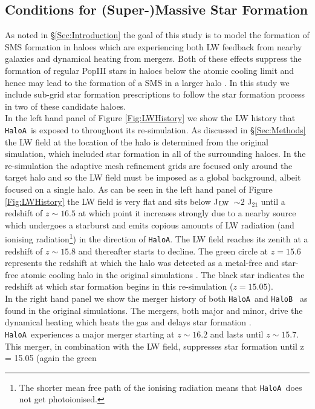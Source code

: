 \documentclass[graphics, twocolumn, usenatbib]{mn2e}
\newcommand{\JLW} {J$_{\rm LW}$}
\newcommand{\ha} {\texttt{HaloA~}}
\newcommand{\hb} {\texttt{HaloB~}}
\newcommand{\hac} {\texttt{HaloA}}
\begin{document}
\subsection{Conditions for (Super-)Massive Star Formation}
As noted in \S \ref{Sec:Introduction} the goal of this study is to model the formation of
SMS formation in haloes which are experiencing both LW feedback from nearby galaxies and
dynamical heating from mergers. Both of these effects suppress the formation of regular
PopIII stars in haloes
below the atomic cooling limit and hence may lead to the formation of a SMS in a larger
halo  \citep[as was found in][]{Wise_2019}. In this study we include 
sub-grid star formation prescriptions to follow the star formation process in 
two of these candidate haloes.\\
\indent In the left hand panel of Figure \ref{Fig:LWHistory} we show the LW history that \ha is
exposed to throughout its re-simulation. As discussed in \S \ref{Sec:Methods} the LW field at the
location of the halo is determined from the original simulation, which included star formation
in all of the surrounding haloes. In the re-simulation the adaptive mesh refinement
grids are focused only around the
target halo and so the LW field must be imposed as a global background, albeit focused on a single
halo. As can be seen in the left hand panel of Figure \ref{Fig:LWHistory} the LW field is
very flat and sits below \JLW \ $\sim 2$
J$_{21}$ until a redshift of $z \sim 16.5$ at which point it increases strongly due to a nearby source
which undergoes a starburst and emits copious amounts of LW radiation
(and ionising radiation\footnote{The
  shorter mean free path of the ionising radiation means that \ha does not get photoionised.}) in the
direction of \hac. The LW field reaches its zenith at a redshift of $z \sim 15.8$ and thereafter
starts to decline. The green circle at $z = 15.6$ represents the redshift at which the halo was
detected as a metal-free and star-free atomic cooling halo in the original simulations
\citep[see][for details]{Regan_2020}. The black star indicates the redshift at which star
formation begins in this re-simulation ($z = 15.05$). \\
\indent In the right hand panel we show the merger history of both \ha and \hb
as found in the original simulations. The mergers, both major and minor, drive the dynamical heating
which heats the gas and delays star formation \citep{Wise_2019}. 
\ha experiences a major merger starting at $z \sim 16.2$ and lasts until $z \sim 15.7$. This
merger, in combination with the LW field, suppresses star formation until z = 15.05 (again the green
\end{document}
